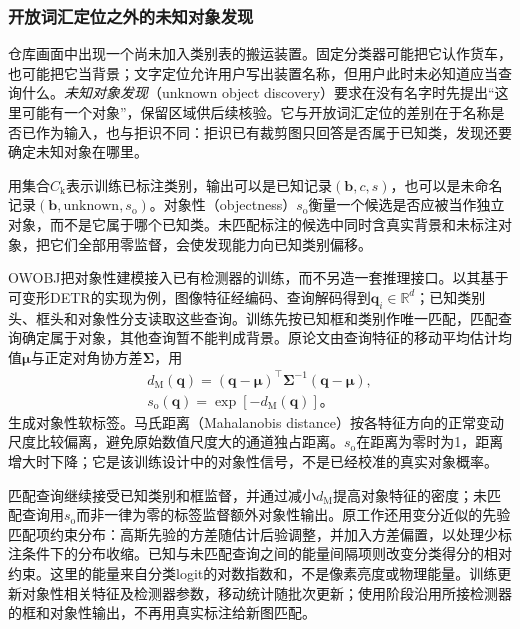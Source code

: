 \subsubsection{开放词汇定位之外的未知对象发现}
\label{sec:vision-recognition-unknown-discovery}

仓库画面中出现一个尚未加入类别表的搬运装置。固定分类器可能把它认作货车，也可能把它当背景；文字定位允许用户写出装置名称，但用户此时未必知道应当查询什么。\emph{未知对象发现}（unknown object discovery）要求在没有名字时先提出“这里可能有一个对象”，保留区域供后续核验。它与开放词汇定位的差别在于名称是否已作为输入，也与拒识不同：拒识已有裁剪图只回答是否属于已知类，发现还要确定未知对象在哪里。

用集合$C_{\mathrm{k}}$表示训练已标注类别，输出可以是已知记录$(\bm{b},c,s)$，也可以是未命名记录$(\bm{b},\mathrm{unknown},s_{\mathrm{o}})$。对象性（objectness）$s_{\mathrm{o}}$衡量一个候选是否应被当作独立对象，而不是它属于哪个已知类。未匹配标注的候选中同时含真实背景和未标注对象，把它们全部用零监督，会使发现能力向已知类别偏移。

OWOBJ把对象性建模接入已有检测器的训练，而不另造一套推理接口。以其基于可变形DETR的实现为例，图像特征经编码、查询解码得到$\bm{q}_i\in\mathbb{R}^d$；已知类别头、框头和对象性分支读取这些查询。训练先按已知框和类别作唯一匹配，匹配查询确定属于对象，其他查询暂不能判成背景。原论文由查询特征的移动平均估计均值$\bm{\mu}$与正定对角协方差$\bm{\Sigma}$，用
\begin{equation}
 \begin{aligned}
 d_{\mathrm{M}}(\bm{q})=
 (\bm{q}-\bm{\mu})^\top\bm{\Sigma}^{-1}(\bm{q}-\bm{\mu}),\\
 s_{\mathrm{o}}(\bm{q})=\exp[-d_{\mathrm{M}}(\bm{q})]\text{。}
 \end{aligned}
 \label{eq:vision-owobj-objectness}
\end{equation}
生成对象性软标签。马氏距离（Mahalanobis distance）按各特征方向的正常变动尺度比较偏离，避免原始数值尺度大的通道独占距离。$s_{\mathrm{o}}$在距离为零时为1，距离增大时下降；它是该训练设计中的对象性信号，不是已经校准的真实对象概率。

匹配查询继续接受已知类别和框监督，并通过减小$d_{\mathrm M}$提高对象特征的密度；未匹配查询用$s_{\mathrm{o}}$而非一律为零的标签监督额外对象性输出。原工作还用变分近似的先验匹配项约束分布：高斯先验的方差随估计后验调整，并加入方差偏置，以处理少标注条件下的分布收缩。已知与未匹配查询之间的能量间隔项则改变分类得分的相对约束。这里的能量来自分类logit的对数指数和，不是像素亮度或物理能量。训练更新对象性相关特征及检测器参数，移动统计随批次更新；使用阶段沿用所接检测器的框和对象性输出，不再用真实标注给新图匹配。

